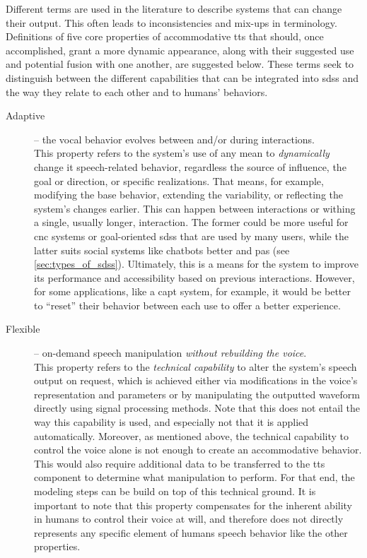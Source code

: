 Different terms are used in the literature to describe systems that can change their output.
This often leads to inconsistencies and mix-ups in terminology.
Definitions of five core properties of accommodative \ac{tts} that should, once accomplished, grant a more dynamic appearance, along with their suggested use and potential fusion with one another, are suggested below.
These terms seek to distinguish between the different capabilities that can be integrated into \acp{sds} and the way they relate to each other and to humans' behaviors.
%
\begin{description}
	\item[Adaptive] -- the vocal behavior evolves between and/or during interactions.\\
	This property refers to the system's use of any mean to \emph{dynamically} change it speech-related behavior, regardless the source of influence, the goal or direction, or specific realizations.
	That means, for example, modifying the base behavior, extending the variability, or reflecting the system's changes earlier.
	This can happen between interactions or withing a single, usually longer, interaction.
	The former could be more useful for \ac{cnc} systems or goal-oriented \acp{sds} that are used by many users, while the latter suits social systems like chatbots better and \acp{pa} (see \cref{sec:types_of_sdss}).
	Ultimately, this is a means for the system to improve its performance and accessibility based on previous interactions.
	However, for some applications, like a \ac{capt} system, for example, it would be better to \enquote{reset} their behavior between each use to offer a better experience.

	\item[Flexible] -- on-demand speech manipulation \emph{without rebuilding the voice}.\\
	This property refers to the \emph{technical capability} to alter the system's speech output on request, which is achieved either via modifications in the voice's representation and parameters or by manipulating the outputted waveform directly using signal processing methods.
	Note that this does not entail the way this capability is used, and especially not that it is applied automatically.
	Moreover, as mentioned above, the technical capability to control the voice alone is not enough to create an accommodative behavior.
	This would also require additional data to be transferred to the \ac{tts} component to determine what manipulation to perform.
	For that end, the modeling steps can be build on top of this technical ground.
	It is important to note that this property compensates for the inherent ability in humans to control their voice at will, and therefore does not directly represents any specific element of humans speech behavior like the other properties.
	

\end{description}

